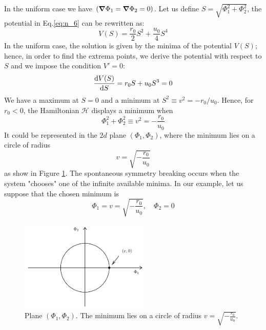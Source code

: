 \documentclass[../main/main.tex]{subfiles}
\begin{document}
In the uniform case we have \( (\grad \Phi _1 = \grad \Phi _2 = 0) \). Let us define
\( S = \sqrt{\Phi _1^2 + \Phi _2^2}  \), the potential in Eq.\eqref{eq:n_6} can be rewritten as:
\begin{equation*}
  V (S) = \frac{r_0}{2} S^2 + \frac{u_0}{4} S^4
\end{equation*}
In the uniform case, the solution is given by the minima of the potential \( V(S) \); hence, in order to find the extrema points, we derive the potential with respect to \( S \) and we impose the condition \( V'=0 \):
\begin{equation*}
  \dv{V(S)}{S} = r_0 S + u_0 S^3 = 0
\end{equation*}
We have a maximum at \( S=0 \) and a minimum at  \( S^2 \equiv v^2 = -  r_0/u_0 \). Hence, for \( r_0 < 0 \), the Hamiltonian \( \mathcal{H} \) displays a minimum when
\begin{equation*}
  \Phi _1^2 + \Phi _2^2 \equiv v^2 = - \frac{r_0}{u_0}
\end{equation*}
It could be represented in the \( 2d \) plane \( (\Phi _1, \Phi _2) \), where the minimum lies on a circle of radius
\begin{equation*}
  v = \sqrt{- \frac{r_0}{u_0}}
\end{equation*}
as show in Figure \ref{fig:n_4}.
The spontaneous symmetry breaking occurs when the system "chooses" one of the infinite available minima.
In our example, let us suppose that the chosen minimum is
\begin{equation}
  \Phi _1 = v = \sqrt{- \frac{r_0}{u_0}}, \quad \Phi _2 = 0
  \label{eq:n_7}
\end{equation}

\begin{figure}[h!]
\centering
\includegraphics[width=0.55\textwidth]{../lessons/n_image/4.pdf}
\caption{\label{fig:n_4} Plane \( (\Phi _1, \Phi _2) \). The minimum lies on a circle of radius \( v = \sqrt{- \frac{r_0}{u_0}} \). }
\end{figure}
\end{document}

